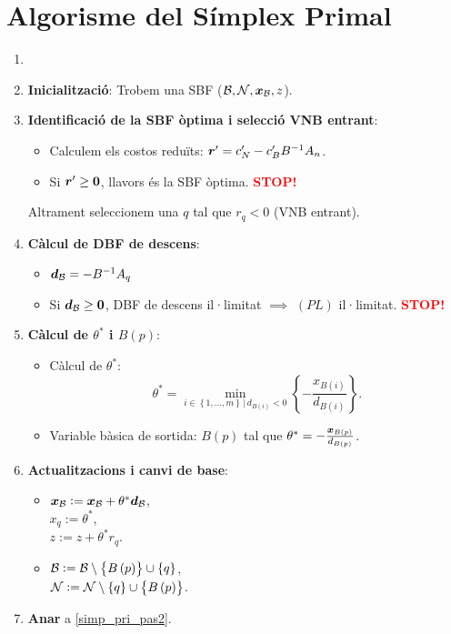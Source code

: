 \section{Algorisme del Símplex Primal}
\begin{alg}\label{alg:asp}
    \begin{enumerate}
        \item[]
        \item {\bf Inicialització}: Trobem una SBF ($\mathcal{B}, \mathcal{N}, \boldsymbol{x}_{\mathcal{B}}, z$).
        \item \label{simp_pri_pas2} {\bf Identificació de la SBF òptima i selecció VNB entrant}:
            \begin{itemize}
                \item Calculem els costos reduïts: $\boldsymbol{r}' = c_N' - c_B'B^{-1}A_n$.
                \item Si $\boldsymbol{r}' \geq \boldsymbol{0}$, llavors és la SBF òptima. \textcolor{red}{\bf STOP!}
            \end{itemize}
            Altrament seleccionem una $q$ tal que $r_q < 0$ (VNB entrant).
        \item {\bf Càlcul de DBF de descens}:
            \begin{itemize}
                \item $\boldsymbol{d}_{\mathcal{B}} = -B^{-1}A_q$
                \item Si $\boldsymbol{d}_{\mathcal{B}} \geq \boldsymbol{0}$, DBF de descens il·limitat $\implies$ $\left(PL\right)$ il·limitat. \textcolor{red}{\bf STOP!}
            \end{itemize}
        \item {\bf Càlcul de $\theta^*$ i $B\left(p\right)$}:
            \begin{itemize}
                \item Càlcul de $\theta^*$: 
                    \[\theta^* = \min_{i \in \left\{ 1, \dots, m \right\} \,|\, d_{B\left(i\right)} < 0} \left\{-\frac{x_{B\left(i\right)}}{d_{B\left(i\right)}} \right\}.\]
                \item Variable bàsica de sortida: $B\left(p\right)$ tal que $\theta^* = -\frac{\boldsymbol{x}_{B\left(p\right)}}{d_{B\left(p\right)}}$.
            \end{itemize}
        \item {\bf Actualitzacions i canvi de base}:
            \begin{itemize}
                \item $\boldsymbol{x}_{\mathcal{B}} := \boldsymbol{x}_{\mathcal{B}} + \theta^*\boldsymbol{d}_{\mathcal{B}}$, \\
                    $x_q := \theta^*$, \\
                    $z := z + \theta^* r_q$.
                \item $\mathcal{B} := \mathcal{B} \setminus \left\{B\left(p\right)\right\} \cup \left\{q\right\}$, \\
                    $\mathcal{N} := \mathcal{N} \setminus \left\{q\right\} \cup \left\{B\left(p\right)\right\}$.
            \end{itemize}
        \item {\bf Anar} a \ref{simp_pri_pas2}.
    \end{enumerate}
\end{alg}
